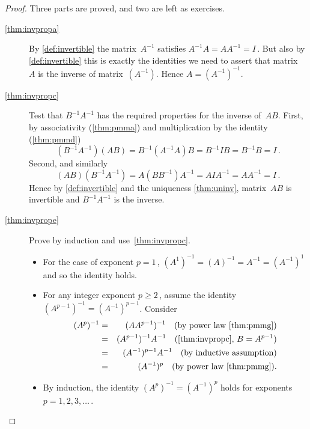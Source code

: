 \begin{proof} 
Three parts are proved, and two are left as exercises.
\begin{description}
\item[\ref{thm:invpropa}]
By \autoref{def:invertible} the matrix~\(A^{-1}\) satisfies \(A^{-1}A=AA^{-1}=I\)\,.
But also by \autoref{def:invertible} this is exactly the identities we need to assert that matrix~\(A\) is the inverse of matrix~\((A^{-1})\).
Hence \(A=(A^{-1})^{-1}\).

\item[\ref{thm:invpropc}]
Test that \(B^{-1}A^{-1}\) has the required properties for the inverse of~\(AB\).
First, by associativity (\autoref{thm:pmma}) and multiplication by the identity (\autoref{thm:pmmd})
\begin{equation*}
(B^{-1}A^{-1})(AB)
=B^{-1}(A^{-1}A)B
=B^{-1}IB
=B^{-1}B
=I\,.
\end{equation*}
Second, and similarly
\begin{equation*}
(AB)(B^{-1}A^{-1})
=A(BB^{-1})A^{-1}
=AIA^{-1}
=AA^{-1}
=I\,.
\end{equation*}
Hence by \autoref{def:invertible} and the uniqueness \autoref{thm:uninv}, matrix~\(AB\) is invertible and \(B^{-1}A^{-1}\) is the inverse.

\item[\ref{thm:invprope}]
Prove by induction and use~\autoref{thm:invpropc}.
\begin{itemize}
\item For the case of exponent \(p=1\)\,, \((A^1)^{-1}=(A)^{-1}=A^{-1}=(A^{-1})^1\) and so the identity holds.
\item For any integer exponent \(p\geq2\)\,, assume the identity \((A^{p-1})^{-1}=(A^{-1})^{p-1}\).
Consider 
\begin{eqnarray*}
(A^p)^{-1}&=&(AA^{p-1})^{-1}\quad(\text{by power law \autoref{thm:pmmg}})
\\&=&(A^{p-1})^{-1}A^{-1}\quad(\text{\autoref{thm:invpropc}, }B=A^{p-1})
\\&=&(A^{-1})^{p-1}A^{-1}\quad(\text{by inductive assumption})
\\&=&(A^{-1})^p \quad(\text{by power law \autoref{thm:pmmg}}).
\end{eqnarray*}
\item By induction, the identity \((A^{p})^{-1}=(A^{-1})^{p}\) holds for exponents \(p=1,2,3,\ldots\)\,.
\end{itemize}
 
\end{description}
\end{proof}




